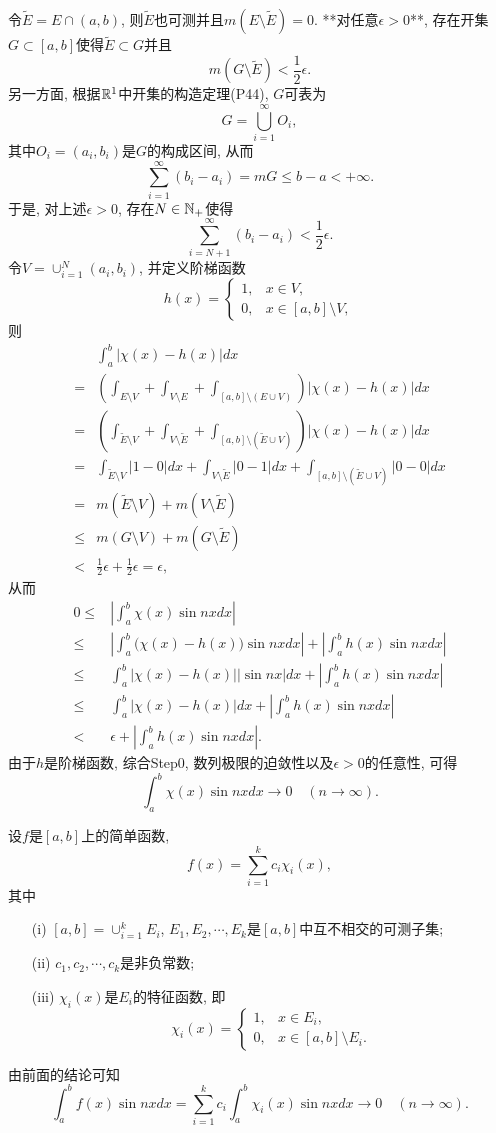 \documentclass[UTF8,oneside,12pt]{article}  %
\makeatletter
\theoremstyle{DingLi1}
\numberwithin{equation}{section}
\theoremstyle{DingLi2}
\renewenvironment{proof}[1][\proofname]{\par%
\pushQED{\qed}%
\normalfont \topsep6\p@\@plus6\p@\relax%
\trivlist%
\item[\hskip\labelsep%
#1]\ignorespaces%
}{%
\popQED\endtrivlist\@endpefalse%
}
\renewcommand{\proofname}{\heiti\large\color{blue} 证明}%
\makeatother
\begin{document}
\begin{proof}
令$\tilde{E}=E\cap (a,b)$, 则$\tilde{E}$也可测并且$m(E\setminus\tilde{E})=0$. **对任意$\epsilon>0$**, 存在开集$G\subset [a,b]$使得$\tilde{E}\subset G$并且
$$m(G\setminus \tilde{E})<\frac12 \epsilon.$$
另一方面, 根据$\Bbb{R}^1$中开集的构造定理(P44), $G$可表为
$$G=\bigcup_{i=1}^\infty O_i,$$
其中$O_i=(a_i,b_i)$是$G$的构成区间, 从而
$$\sum_{i=1}^\infty (b_i-a_i)=mG\leq b-a<+\infty.$$
于是, 对上述$\epsilon>0$, 存在$N\in \Bbb{N}_+$使得
$$\sum_{i=N+1}^\infty (b_i-a_i)<\frac{1}{2}\epsilon.$$
令$V=\cup_{i=1}^N (a_i, b_i)$, 并定义阶梯函数
$$
h(x)
=\left\{\begin{array}{ll}
1,&x\in V,\\
0,&x\in[a,b]\setminus V,
\end{array}\right.
$$
则
$$
\begin{aligned}
&\int_a^b |\chi(x)-h(x)|dx\\
=&\left(\int_{E\setminus V}+\int_{V\setminus E}+\int_{[a,b]\setminus(E\cup V)}\right)|\chi(x)-h(x)|dx\\
=&\left(\int_{\tilde{E}\setminus V}+\int_{V\setminus \tilde{E}}+\int_{[a,b]\setminus(\tilde{E}\cup V)}\right)|\chi(x)-h(x)|dx\\
=&\int_{\tilde{E}\setminus V} |1-0|dx +\int_{V\setminus \tilde{E}}|0-1|dx+\int_{[a,b]\setminus(\tilde{E}\cup V)}|0-0|dx\\
=&m(\tilde{E}\setminus V)+m(V\setminus \tilde{E})\\
\leq&m(G\setminus V)+m(G\setminus \tilde{E})\\
<&\frac12\epsilon+\frac12\epsilon=\epsilon,
\end{aligned}
$$
从而
$$
\begin{aligned}
0\leq&\left|\int_a^b \chi(x)\sin nx dx\right|\\
\leq&\left|\int_a^b \big(\chi(x)-h(x)\big)\sin nx dx\right|+\left|\int_a^b h(x)\sin nx dx\right|\\
\leq&\int_a^b \left|\chi(x)-h(x)\right||\sin nx| dx+\left|\int_a^b h(x)\sin nx dx\right|\\
\leq&\int_a^b \left|\chi(x)-h(x)\right| dx+\left|\int_a^b h(x)\sin nx dx\right|\\
<&\epsilon+\left|\int_a^b h(x)\sin nx dx\right|.
\end{aligned}
$$
由于$h$是阶梯函数, 综合Step0, 数列极限的迫敛性以及$\epsilon>0$的任意性, 可得
$$\int_a^b \chi(x)\sin nx dx\to 0\quad (n\to \infty).$$

设$f$是$[a,b]$上的简单函数,
$$f(x)=\sum_{i=1}^k c_i \chi_i(x),$$
其中
\begin{itemize}
   \item[(i)] $[a,b]=\cup_{i=1}^k E_i$, $E_1,E_2,\cdots,E_k$是$[a,b]$中互不相交的可测子集;
    \item[(ii)] $c_1,c_2,\cdots,c_k$是非负常数;
    \item[(iii)] $\chi_i(x)$是$E_i$的特征函数, 即
    $$
    \chi_i(x)
    =\left\{\begin{array}{ll}
    1,&x\in E_i,\\
    0,&x\in[a,b]\setminus E_i.
    \end{array}\right.
    $$
\end{itemize}
由前面的结论可知
$$\int_a^b f(x)\sin nx dx=\sum_{i=1}^k c_i\int_a^b \chi_i(x)\sin nx dx\to 0\quad (n\to\infty). $$


\end{proof}
\end{document}
